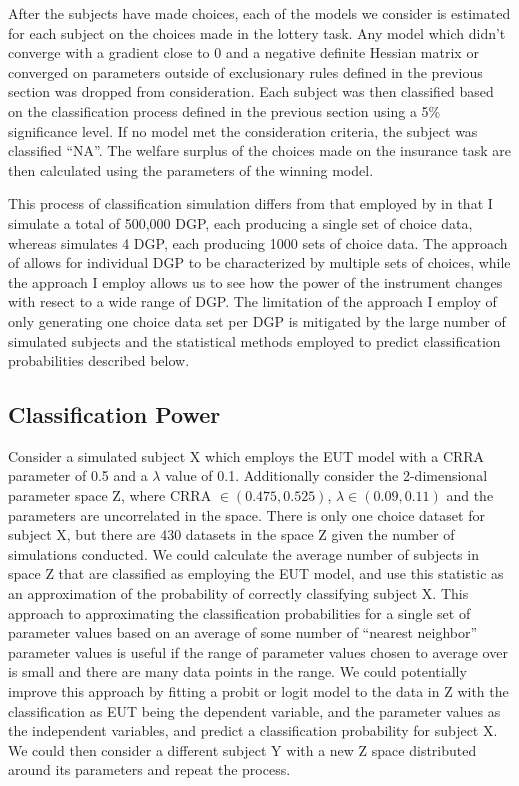 \documentclass[../main.tex]{subfiles}
\begin{document}
After the subjects have made choices, each of the models we consider is estimated for each subject on the choices made in the lottery task.
Any model which didn't converge with a gradient close to 0 and a negative definite Hessian matrix or converged on parameters outside of exclusionary rules defined in the previous section was dropped from consideration.
Each subject was then classified based on the classification process defined in the previous section using a 5\% significance level.
If no model met the consideration criteria, the subject was classified \enquote{NA}.
The welfare surplus of the choices made on the insurance task are then calculated using the parameters of the winning model.

This process of classification simulation differs from that employed by \textcite{Wilcox2015} in that I simulate a total of 500,000 DGP, each producing a single set of choice data, whereas \textcite{Wilcox2015} simulates 4 DGP, each producing 1000 sets of choice data.
The approach of \textcite{Wilcox2015} allows for individual DGP to be characterized by multiple sets of choices, while the approach I employ allows us to see how the power of the instrument changes with resect to a wide range of DGP.
The limitation of the approach I employ of only generating one choice data set per DGP is mitigated by the large number of simulated subjects and the statistical methods employed to predict classification probabilities described below.

\subsection{\texorpdfstring{\textcite{Harrison2016}}{Harrison and Ng (2016)} Classification Power}

Consider a simulated subject X which employs the EUT model with a CRRA parameter of 0.5 and a $\lambda$ value of 0.1.
Additionally consider the 2-dimensional parameter space Z, where CRRA $\in (0.475,0.525)$, $\lambda \in (0.09, 0.11)$ and the parameters are uncorrelated in the space.
There is only one choice dataset for subject X, but there are 430 datasets in the space Z given the number of simulations conducted.
We could calculate the average number of subjects in space Z that are classified as employing the EUT model, and use this statistic as an approximation of the probability of correctly classifying subject X.
This approach to approximating the classification probabilities for a single set of parameter values based on an average of some number of \enquote{nearest neighbor} parameter values is useful if the range of parameter values chosen to average over is small and there are many data points in the range.
We could potentially improve this approach by fitting a probit or logit model to the data in Z with the classification as EUT being the dependent variable, and the parameter values as the independent variables, and predict a classification probability for subject X.
We could then consider a different subject Y with a new Z space distributed around its parameters and repeat the process.
\end{document}
